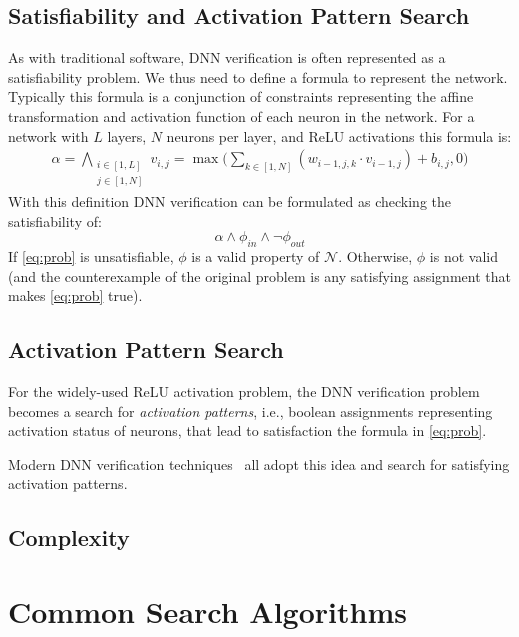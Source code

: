 \documentclass[oneside,11pt,dvipsnames]{book}
\begin{document}
\section{Satisfiability and Activation Pattern Search} As with traditional software, DNN verification is often represented as a satisfiability problem.
We thus need to define a formula to represent the network. Typically this formula is a conjunction of constraints representing the affine transformation and activation function of each neuron in the network.
For a network with $L$ layers, $N$ neurons per layer, and ReLU activations this formula is:
\begin{align*}
\alpha = \bigwedge_{\begin{smallmatrix}i \in [1,L]\\ j \in [1,N]\end{smallmatrix}} v_{i,j} = \max \Big( \sum_{k \in [1,N]} (w_{i-1,j,k} \cdot v_{i-1,j}) + b_{i,j}, 0 \Big)
\end{align*}
With this definition DNN verification can be formulated as checking the satisfiability of:
\begin{equation}\label{eq:prob}
  \alpha \land \phi_{in} \land \neg \phi_{out}
\end{equation}
If \autoref{eq:prob} is unsatisfiable, $\phi$ is a valid property of $\mathcal{N}$. Otherwise, $\phi$ is not valid (and the counterexample of the original problem is any satisfying assignment that makes \autoref{eq:prob} true).


\section{Activation Pattern Search} For the widely-used ReLU activation problem, the DNN verification problem becomes a search for \emph{activation patterns}, i.e., boolean assignments representing activation status of neurons, that lead to satisfaction the formula in \autoref{eq:prob}. 

Modern DNN verification techniques~\cite{bunel2020branch,wang2021beta,ferrari2022complete,duong2024harnessing,duong2023dpllt,ovalbab,katz2019marabou,bak2021nnenum} all adopt this idea and search for satisfying activation patterns.


\section{Complexity}

\chapter{Common Search Algorithms}
\end{document}
